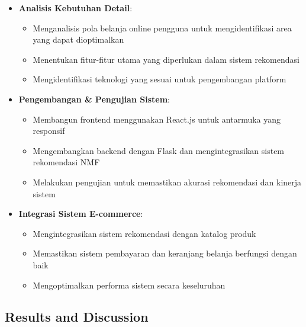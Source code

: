 \documentclass[journal,article,submit,pdftex,moreauthors]{Definitions/mdpi}
\begin{document}
\begin{itemize}
    \item \textbf{Analisis Kebutuhan Detail}:
    \begin{itemize}
        \item Menganalisis pola belanja online pengguna untuk mengidentifikasi area yang dapat dioptimalkan
        \item Menentukan fitur-fitur utama yang diperlukan dalam sistem rekomendasi
        \item Mengidentifikasi teknologi yang sesuai untuk pengembangan platform
    \end{itemize}

    \item \textbf{Pengembangan \& Pengujian Sistem}:
    \begin{itemize}
        \item Membangun frontend menggunakan React.js untuk antarmuka yang responsif
        \item Mengembangkan backend dengan Flask dan mengintegrasikan sistem rekomendasi NMF
        \item Melakukan pengujian untuk memastikan akurasi rekomendasi dan kinerja sistem
    \end{itemize}

    \item \textbf{Integrasi Sistem E-commerce}:
    \begin{itemize}
        \item Mengintegrasikan sistem rekomendasi dengan katalog produk
        \item Memastikan sistem pembayaran dan keranjang belanja berfungsi dengan baik
        \item Mengoptimalkan performa sistem secara keseluruhan
    \end{itemize}
\end{itemize}

\subsection{Results and Discussion}
\end{document}
